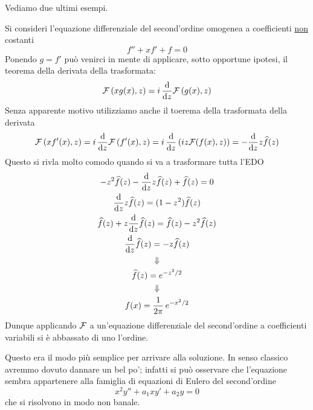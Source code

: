 Vediamo due ultimi esempi.

\begin{exa}
Si consideri l'equazione differenziale del second'ordine omogenea a coefficienti \underline{non} costanti
\begin{equation*}
f''+xf'+f=0
\end{equation*}
Ponendo $g=f'$ può venirci in mente di applicare, sotto opportune ipotesi, il teorema della derivata della trasformata:
\begin{equation*}
\mathcal{F}\left(xg(x),z\right)=i\,\frac{\mathrm{d}}{\mathrm{d} z}\mathcal{F}\left(g(x),z\right)
\end{equation*}
Senza apparente motivo utilizziamo anche il toerema della trasformata della derivata
\begin{equation*}
\mathcal{F}\left(xf'(x),z\right)=i\,\frac{\mathrm{d}}{\mathrm{d} z}\mathcal{F}\left(f'(x),z\right)=i\,\frac{\mathrm{d}}{\mathrm{d} z}\left(iz\mathcal{F}(f(x),z)\right)=-\frac{\mathrm{d}}{\mathrm{d} z}z\widehat{f}(z)
\end{equation*}
Questo si rivla molto comodo quando si va a trasformare tutta l'EDO
\begin{gather*}
-z^2\widehat{f}(z)-\frac{\mathrm{d}}{\mathrm{d} z}z\widehat{f}(z)+\widehat{f}(z)=0\\
\frac{\mathrm{d}}{\mathrm{d} z}z\widehat{f}(z)=(1-z^2)\widehat{f}(z) \\
\widehat{f}(z)+z\frac{\mathrm{d}}{\mathrm{d} z}\widehat{f}(z)=\widehat{f}(z)-z^2\widehat{f}(z)\\
\frac{\mathrm{d}}{\mathrm{d} z}\widehat{f}(z)=-z\widehat{f}(z)\\
\Downarrow \\
\widehat{f}(z)=e^{-z^2/2}\\
\Downarrow \\
f(x)=\frac{1}{2\pi}\,e^{-x^2/2}
\end{gather*}
Dunque applicando $\mathcal{F}$ a un'equazione differenziale del second'ordine a coefficienti variabili si è abbassato di uno l'ordine.
\begin{rem}
Questo era il modo più semplice per arrivare alla soluzione. In senso classico avremmo dovuto dannare un bel po'; infatti si può osservare che l'equazione sembra appartenere alla famiglia di equazioni di Eulero del second'ordine
\begin{equation*}
x^2y''+a_1xy'+a_2y=0
\end{equation*}
che si risolvono in modo non banale.
\end{rem}
\end{exa}


